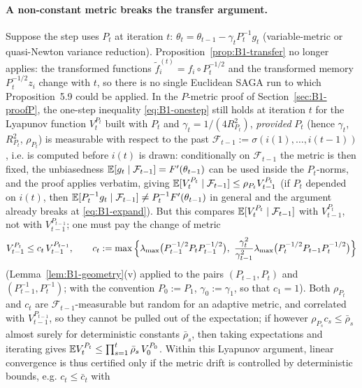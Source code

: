 \paragraph{A non-constant metric breaks the transfer argument.}
Suppose the step uses $P_t$ at iteration $t$: $\theta_t=\theta_{t-1}-\gamma_tP_t^{-1}g_t$ (variable-metric
or quasi-Newton variance reduction). Proposition~\ref{prop:B1-transfer} no longer applies: the transformed
functions $\tilde f_i^{(t)}=f_i\circ P_t^{-1/2}$ and the transformed memory $P_t^{-1/2}z_i$ change with
$t$, so there is no single Euclidean SAGA run to which Proposition~5.9 could be applied. In the $P$-metric
proof of Section~\ref{sec:B1-proofP}, the one-step inequality \eqref{eq:B1-onestep} still holds at
iteration $t$ for the Lyapunov function $V_t^{P_t}$ built with $P_t$ and $\gamma_t=1/(4R_{P_t}^2)$,
\emph{provided} $P_t$ (hence $\gamma_t$, $R_{P_t}^2$, $\rho_{P_t}$) is measurable with respect to the past
$\mathcal F_{t-1}:=\sigma(i(1),\dots,i(t-1))$, i.e. is computed before $i(t)$ is drawn: conditionally on
$\mathcal F_{t-1}$ the metric is then fixed, the unbiasedness $\mathbb{E}[g_t\mid\mathcal F_{t-1}]=F'(\theta_{t-1})$
can be used inside the $P_t$-norms, and the proof applies verbatim, giving
$\mathbb{E}[V_t^{P_t}\mid\mathcal F_{t-1}]\le\rho_{P_t}V_{t-1}^{P_t}$ (if $P_t$ depended on $i(t)$, then
$\mathbb{E}[P_t^{-1}g_t\mid\mathcal F_{t-1}]\neq P_t^{-1}F'(\theta_{t-1})$ in general and the argument already
breaks at \eqref{eq:B1-expand}). But this compares $\mathbb{E}[V_t^{P_t}\mid\mathcal F_{t-1}]$ with
$V_{t-1}^{P_t}$, not with $V_{t-1}^{P_{t-1}}$; one must pay the change of metric
\begin{equation}\label{eq:B1-metric-drift}
V_{t-1}^{P_t}\le c_t\,V_{t-1}^{P_{t-1}},\qquad
c_t:=\max\Big\{\lambda_{\max}\big(P_{t-1}^{-1/2}P_tP_{t-1}^{-1/2}\big),\
\frac{\gamma_t^2}{\gamma_{t-1}^2}\lambda_{\max}\big(P_t^{-1/2}P_{t-1}P_t^{-1/2}\big)\Big\}
\end{equation}
(Lemma~\ref{lem:B1-geometry}(v) applied to the pairs $(P_{t-1},P_t)$ and $(P_{t-1}^{-1},P_t^{-1})$; with
the convention $P_0:=P_1$, $\gamma_0:=\gamma_1$, so that $c_1=1$). Both $\rho_{P_t}$ and $c_t$ are
$\mathcal F_{t-1}$-measurable but random for an adaptive metric, and correlated with $V_{t-1}^{P_{t-1}}$,
so they cannot be pulled out of the expectation; if however $\rho_{P_s}c_s\le\bar\rho_s$ almost surely for
deterministic constants $\bar\rho_s$, then taking expectations and iterating gives
$\mathbb{E} V_t^{P_t}\le\prod_{s=1}^t\bar\rho_s\,V_0^{P_0}$. Within this Lyapunov argument, linear convergence is
thus certified only if the metric drift is controlled by deterministic bounds, e.g. $c_t\le\bar c_t$ with
